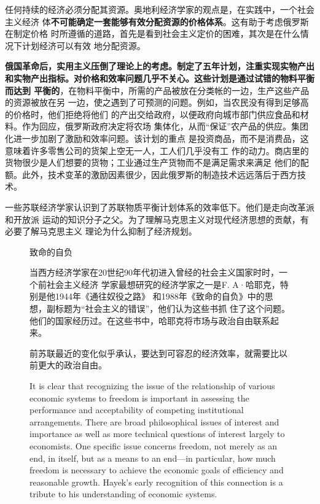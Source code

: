 任何持续的经济必须分配其资源。奥地利经济学家的观点是，在实践中，一个社会主义经济
体\textbf{不可能确定一套能够有效分配资源的价格体系}。这有助于考虑俄罗斯在制定价格
时所遵循的道路，首先是看到社会主义定价的困难，其次是在什么情况下计划经济可以有效
地分配资源。

\textbf{俄国革命后，实用主义压倒了理论上的考虑。制定了五年计划，注重实现实物产出
  和实物产出指标。对价格和效率问题几乎不关心。这些计划是通过试错的物料平衡而达到
  平衡的}，在物料平衡中，所需的产品被放在分类帐的一边，生产这些产品的资源被放在另
一边，使之遇到了可预测的问题。例如，当农民没有得到足够高的价格时，他们拒绝将他们
的产出交给政府，以便政府向城市部门供应食品和材料。作为回应，俄罗斯政府决定将农场
集体化，从而“保证”农产品的供应。集团化进一步加剧了激励和效率问题。该计划的重点
是投资商品，而不是消费品，这意味着许多零售公司的货架上空无一人，工人们几乎没有工
作的动力。商店里的货物很少是人们想要的货物；工业通过生产货物而不是满足需求来满足
他们的配额。此外，技术变革的激励因素很少，因此俄罗斯的制造技术远远落后于西方技
术。

一些苏联经济学家认识到了苏联物质平衡计划体系的效率低下。他们是走向改革派和开放派
运动的知识分子之父。为了理解马克思主义对现代经济思想的贡献，有必要了解马克思主义
理论为什么抑制了经济规划。

\begin{figure}[ht]
\begin{mybox}{致命的自负}
  \begin{multicols}{2}
    当西方经济学家在20世纪90年代初进入曾经的社会主义国家时时，一个前社会主义经济
    学家最想研究的经济学家之一是F. A·哈耶克，特别是他1944年《通往奴役之路》
    和1988年《致命的自负》中的思想，副标题为“社会主义的错误”，他们认为这些书抓
    住了这个问题。他们的国家经历过。在这些书中，哈耶克将市场与政治自由联系起来。

    前苏联最近的变化似乎承认，要达到可容忍的经济效率，就需要比以前更大的政治自由。

    It is clear that recognizing the issue of the relationship of various
    economic systems to freedom is important in assessing the performance and
    acceptability of competing institutional arrangements. There are broad
    philosophical issues of interest and importance as well as more technical
    questions of interest largely to economists. One specific issue concerns
    freedom, not merely as an end, in itself, but as a means to an end—in
    particular, how much freedom is necessary to achieve the economic goals of
    efficiency and reasonable growth. Hayek’s early recognition of this
    connection is a tribute to his understanding of economic systems.
  \end{multicols}
\end{mybox}
\end{figure}

